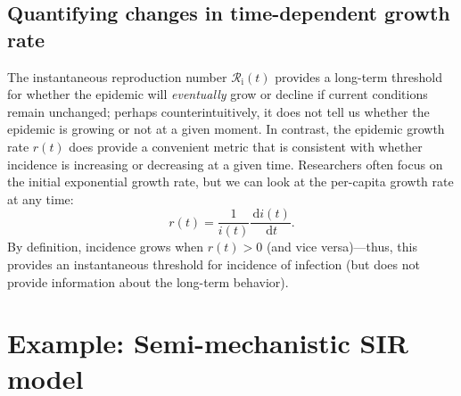 \documentclass[12pt]{article}
\newcommand{\Rx}[1]{\ensuremath{{\mathcal R}_{#1}}\xspace}
\newcommand{\Ri}{\Rx{\mathrm{i}}}
\newcommand{\dd}[1]{\ensuremath{\, \mathrm{d}#1}}
\begin{document}
\subsection{Quantifying changes in time-dependent growth rate}

The instantaneous reproduction number $\Ri(t)$ provides a long-term threshold for whether the epidemic will \emph{eventually} grow or decline if current conditions remain unchanged;
perhaps counterintuitively, it does not tell us whether the epidemic is growing or not at a given moment.
In contrast, the epidemic growth rate $r(t)$ does provide a convenient metric that is consistent with whether incidence is increasing or decreasing at a given time.
Researchers often focus on the initial exponential growth rate, but we can look at the per-capita growth rate at any time:
\begin{equation}
r(t) = \frac{1}{i(t)} \frac{\dd{i(t)}}{\dd{t}}.
\end{equation}
By definition, incidence grows when $r(t) > 0$ (and vice versa)---thus, this provides an instantaneous threshold for incidence of infection (but does not provide information about the long-term behavior).

\section{Example: Semi-mechanistic SIR model}
\end{document}
